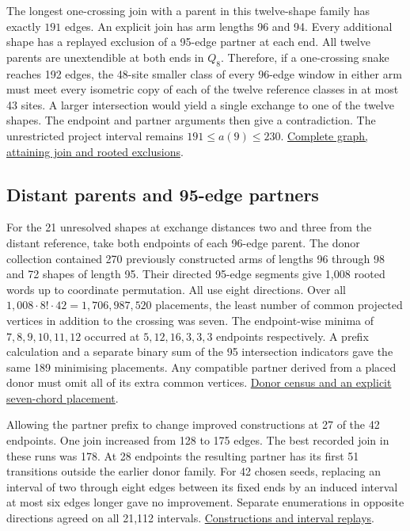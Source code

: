 \documentclass[11pt,a4paper]{article}
\theoremstyle{definition}
\theoremstyle{remark}
\begin{document}
The longest one-crossing join with a parent in this twelve-shape
family has exactly \(191\) edges. An explicit join has arm lengths 96
and 94. Every additional shape has a replayed exclusion of a 95-edge
partner at each end. All twelve parents are unextendible at both ends
in \(Q_8\). Therefore, if a one-crossing snake reaches 192 edges, the
48-site smaller class of every 96-edge window in either arm must meet
every isometric copy of each of the twelve reference classes in at
most 43 sites. A larger intersection would yield a single exchange to
one of the twelve shapes. The endpoint and partner arguments then give
a contradiction. The unrestricted project interval remains
\(191\leq a(9)\leq230\).
\href{https://github.com/hironaka-iori/Snake-in-the-box-in-9/tree/main/milestones/259-four-exchange-component}{Complete graph, attaining join and rooted exclusions}.

\subsection{Distant parents and 95-edge partners}
For the 21 unresolved shapes at exchange distances two and three from
the distant reference, take both endpoints of each 96-edge parent.
The donor collection contained 270 previously constructed arms
of lengths 96 through 98 and 72 shapes of length 95. Their directed
95-edge segments give 1,008 rooted words up to coordinate permutation.
All use eight directions. Over all \(1{,}008\cdot8!\cdot42
=1{,}706{,}987{,}520\) placements, the least number of common
projected vertices in addition to the crossing was seven. The
endpoint-wise minima of \(7,8,9,10,11,12\) occurred at
\(5,12,16,3,3,3\) endpoints respectively. A prefix calculation and
a separate binary sum of the 95 intersection indicators gave the same
189 minimising placements. Any compatible partner derived from a
placed donor must omit all of its extra common vertices.
\href{https://github.com/hironaka-iori/Snake-in-the-box-in-9/tree/main/milestones/260-donor-intersections}{Donor census and an explicit seven-chord placement}.

Allowing the partner prefix to change improved constructions at 27
of the 42 endpoints. One join increased from 128 to 175 edges. The
best recorded join in these runs was 178. At 28 endpoints the resulting
partner has its first 51 transitions outside the earlier donor family.
For 42 chosen seeds, replacing an interval of two through eight edges
between its fixed ends by an induced interval at most six edges longer
gave no improvement. Separate enumerations in opposite directions
agreed on all 21,112 intervals.
\href{https://github.com/hironaka-iori/Snake-in-the-box-in-9/tree/main/milestones/261-rerouted-partners}{Constructions and interval replays}.
\end{document}

